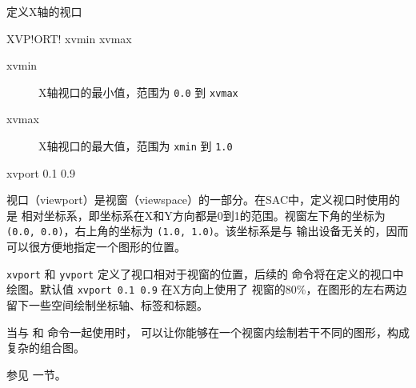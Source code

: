 \label{cmd:xvport}

定义X轴的视口

\begin{SACSTX}
XVP!ORT! xvmin xvmax
\end{SACSTX}

\begin{description}
\item [xvmin] X轴视口的最小值，范围为 \texttt{0.0} 到 \texttt{xvmax}
\item [xvmax] X轴视口的最大值，范围为 \texttt{xmin} 到 \texttt{1.0}
\end{description}

\begin{SACDFT}
xvport 0.1 0.9
\end{SACDFT}

视口（viewport）是视窗（viewspace）的一部分。在SAC中，定义视口时使用的是
相对坐标系，即坐标系在X和Y方向都是0到1的范围。视窗左下角的坐标为
\texttt{(0.0, 0.0)}，右上角的坐标为 \texttt{(1.0, 1.0)}。该坐标系是与
输出设备无关的，因而可以很方便地指定一个图形的位置。

\texttt{xvport} 和 \texttt{yvport} 定义了视口相对于视窗的位置，后续的
命令将在定义的视口中绘图。默认值 \texttt{xvport 0.1 0.9} 在X方向上使用了
视窗的80\%，在图形的左右两边留下一些空间绘制坐标轴、标签和标题。

当与  和  命令一起使用时，
可以让你能够在一个视窗内绘制若干不同的图形，构成复杂的组合图。

参见  一节。
